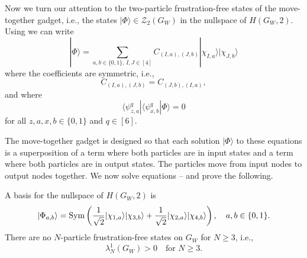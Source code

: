 \documentclass[../thesis-main/thesis-main]{subfiles}
\begin{document}
Now we turn our attention to the two-particle frustration-free states of the move-together gadget, i.e., the states $|\Phi\rangle\in\mathcal{Z}_{2}(G_{W})$ in the nullspace of $H(G_W,2)$. Using  we can write
\begin{equation}
|\Phi\rangle=\sum_{a,b \in \{0,1\},\,I,J \in [4]}C_{(I,a),(J,b)}|\chi_{I,a}\rangle|\chi_{J,b}\rangle\label{eq:chi_superposition}
\end{equation}
where the coefficients are symmetric, i.e.,
\begin{equation}
C_{(I,a),(J,b)}=C_{(J,b),(I,a)},\label{eq:symmetric_coefs}
\end{equation}
and where 
\begin{equation}
\langle\psi_{z,a}^{q}|\langle\psi_{x,b}^{q}|\Phi\rangle=0\label{eq:frustration_free}
\end{equation}
for all $z,a,x,b\in\{0,1\}$ and $q\in[6].$

The move-together gadget is designed so that each solution $|\Phi\rangle$ to these equations  is a superposition of a term where both particles are in input states and a term where both particles are in output states. The particles move from input nodes to output nodes together. We now solve equations -- and prove the following.

\begin{lemma}
\label{lem:Wgadget_lemma}
A basis for the nullspace of $H(G_{W},2)$ is 
\begin{equation}
|\Phi_{a,b}\rangle=\operatorname{Sym}\left(\frac{1}{\sqrt{2}}|\chi_{1,a}\rangle|\chi_{3,b}\rangle+\frac{1}{\sqrt{2}}|\chi_{2,a}\rangle|\chi_{4,b}\rangle\right),\quad a,b\in\{0,1\}.\label{eq:phi_a1_a2}
\end{equation}
There are no $N$-particle frustration-free states on $G_{W}$ for $N\geq3$, i.e.,
\[
\lambda_{N}^{1}(G_{W})>0\quad\text{for }N\geq3.
\]
\end{lemma}
\end{document}
